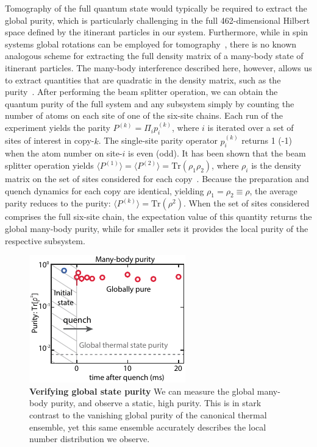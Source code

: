 Tomography of the full quantum state would typically be required to extract the global purity, which is particularly challenging in the full 462-dimensional Hilbert space defined by the itinerant particles in our system. Furthermore, while in spin systems global rotations can be employed for tomography~\cite{Sackett2000}, there is no known analogous scheme for extracting the full density matrix of a many-body state of itinerant particles. The many-body interference described here, however, allows us to extract quantities that are quadratic in the density matrix, such as the purity~\cite{Islam2015}. After performing the beam splitter operation, we can obtain the quantum purity of the full system and any subsystem simply by counting the number of atoms on each site of one of the six-site chains. Each run of the experiment yields the parity $P^{(k)} = \Pi_i p^{(k)}_i$, where $i$ is iterated over a set of sites of interest in copy-$k$. The single-site parity operator $p^{(k)}_i$ returns 1 (-1) when the atom number on site-$i$ is even (odd). It has been shown that the beam splitter operation yields $\langle P^{(1)} \rangle = \langle P^{(2)} \rangle = \mathrm{Tr}\left (\rho_1 \rho_2  \right)$, where $\rho_i$ is the density matrix on the set of sites considered for each copy~\cite{Palmer2005, Daley2012,Islam2015}. Because the preparation and quench dynamics for each copy are identical, yielding $\rho_1 = \rho_2 \equiv \rho$, the average parity reduces to the purity: $\langle P^{(k)} \rangle = \mathrm{Tr}(\rho^2)$. When the set of sites considered comprises the full six-site chain, the expectation value of this quantity returns the global many-body purity, while for smaller sets it provides the local purity of the respective subsystem.

\begin{figure}[t]
	\centering
	\includegraphics[scale=2]{figures/ETH_purity.pdf}
	\caption{{\bf Verifying global state purity}  We can measure the global many-body purity, and observe a static, high purity. This is in stark contrast to the vanishing global purity of the canonical thermal ensemble, yet this same ensemble accurately describes the local number distribution we observe.
	}
	\label{fig:ETH_purity}
\end{figure}

